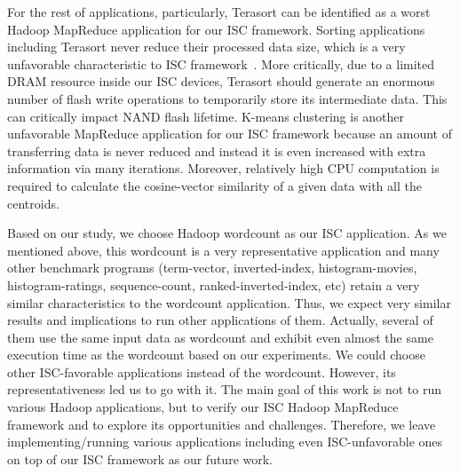 For the rest of applications, particularly, Terasort can be identified as a worst Hadoop MapReduce application for our ISC framework. Sorting applications including Terasort never reduce their processed data size, which is a very unfavorable characteristic to ISC framework~\cite{SmartSSD:SIGMOD:2013}. More critically, due to a limited DRAM resource inside our ISC devices, Terasort should generate an enormous number of flash write operations to temporarily store its intermediate data. This can critically impact NAND flash lifetime.
K-means clustering is another unfavorable MapReduce application for our ISC framework because an amount of transferring data is never reduced and instead it is even increased with extra information via many iterations. Moreover, relatively high CPU computation is required to calculate the cosine-vector similarity of a given data with all the centroids.

Based on our study, we choose Hadoop wordcount as our ISC application. As we mentioned above, this wordcount is a very representative application and many other benchmark programs (term-vector, inverted-index, histogram-movies, histogram-ratings, sequence-count, ranked-inverted-index, etc) retain a very similar characteristics to the wordcount application. Thus, we expect very similar results and implications to run other applications of them. Actually, several of them use the same input data as wordcount and exhibit even almost the same execution time as the wordcount based on our experiments. We could choose other ISC-favorable applications instead of the wordcount. However, its representativeness led us to go with it. 
The main goal of this work is not to run various Hadoop applications, but to verify our ISC Hadoop MapReduce framework and to explore its opportunities and challenges. Therefore, we leave implementing/running various applications including even ISC-unfavorable ones on top of our ISC framework as our future work.




